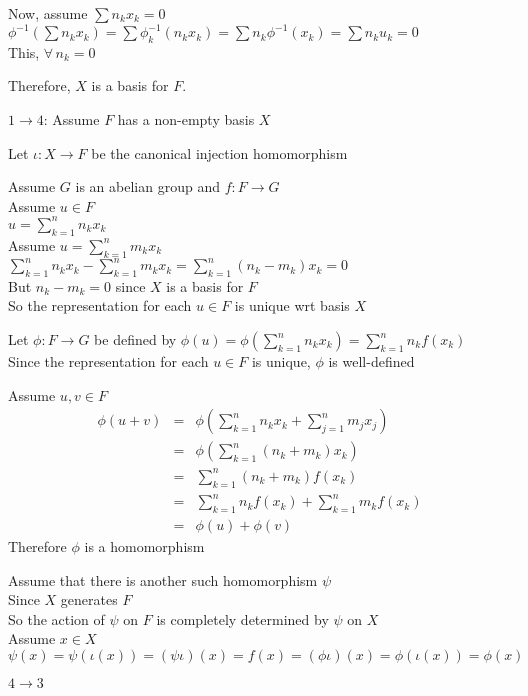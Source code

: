 \documentclass[letterpaper,12pt,fleqn]{article}
\begin{document}
\begin{theproof}
\begin{description}
    Now, assume $\sum n_kx_k=0$ \\
    $\phi^{-1}(\sum n_kx_k)=\sum\phi_k^{-1}(n_kx_k)=\sum n_k\phi^{-1}(x_k)=
    \sum n_ku_k=0$ \\
    This, $\forall\,n_k=0$

    Therefore, $X$ is a basis for $F$.

  \item $1\to 4$: Assume $F$ has a non-empty basis $X$

    Let $\iota:X\to F$ be the canonical injection homomorphism

    Assume $G$ is an abelian group and $f:F\to G$ \\
    Assume $u\in F$ \\
    $u=\sum_{k=1}^nn_kx_k$ \\
    Assume $u=\sum_{k=1}^nm_kx_k$ \\
    $\sum_{k=1}^nn_kx_k-\sum_{k=1}^nm_kx_k=\sum_{k=1}^n(n_k-m_k)x_k=0$ \\
    But $n_k-m_k=0$ since $X$ is a basis for $F$ \\
    So the representation for each $u\in F$ is unique wrt basis $X$

    Let $\phi:F\to G$ be defined by $\phi(u)=\phi(\sum_{k=1}^nn_kx_k)=
    \sum_{k=1}^nn_kf(x_k)$ \\
    Since the representation for each $u\in F$ is unique, $\phi$ is
    well-defined

    Assume $u,v\in F$
    \begin{eqnarray*}
      \phi(u+v) &=& \phi(\sum_{k=1}^nn_kx_k+\sum_{j=1}^nm_jx_j) \\
      &=& \phi(\sum_{k=1}^n(n_k+m_k)x_k) \\
      &=& \sum_{k=1}^n(n_k+m_k)f(x_k) \\
      &=& \sum_{k=1}^nn_kf(x_k)+\sum_{k=1}^nm_kf(x_k) \\
      &=& \phi(u)+\phi(v)
    \end{eqnarray*}
    Therefore $\phi$ is a homomorphism

    Assume that there is another such homomorphism $\psi$ \\
    Since $X$ generates $F$ \\
    So the action of $\psi$ on $F$ is completely determined by $\psi$ on $X$ \\
    Assume $x\in X$ \\
    $\psi(x)=\psi(\iota(x))=(\psi\iota)(x)=f(x)=(\phi\iota)(x)=\phi(\iota(x))=
    \phi(x)$

    \item $4\to 3$ 
  \end{description}
\end{theproof}
\end{document}
